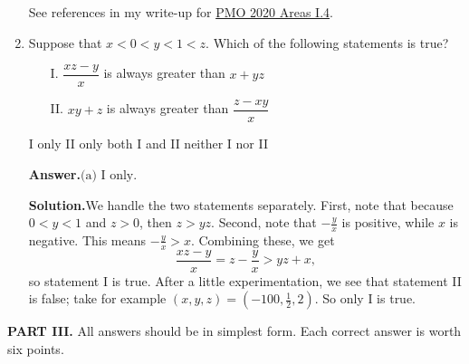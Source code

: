 \documentclass[11pt,paper=letter]{scrartcl}
\newcommand{\ans}{{\sffamily \bfseries Answer.}\;}
\newcommand{\ansb}[2]{\ans\(\boxed{\text{(#1) #2}}\).}
\newcommand{\sol}{{\sffamily \bfseries Solution.}\;}
\newenvironment{rem}%
{\noindent \ignorespaces \small \sffamily \sansmath {\bfseries Remark.}}%
{\ignorespacesafterend}
\begin{document}
\begin{enumerate}[left=0pt]
\begin{rem}
See references in my write-up for \href{https://cjquines.com/files/pmo2020areas.pdf}{PMO 2020 Areas I.4}.
\end{rem}

\item Suppose that $x < 0 < y < 1 < z$. Which of the following statements is true?

\begin{enumerate}
\item[I.] $\dfrac{xz - y}{x}$ is always greater than $x + yz$
\item [II.] $xy + z$ is always greater than $\dfrac{z - xy}{x}$
\end{enumerate}

\fourch
{I only}
{II only}
{both I and II}
{neither I nor II}

\ansb{a}{I only}

\sol We handle the two statements separately. First, note that because $0 < y < 1$ and $z > 0$, then $z > yz$. Second, note that $-\frac{y}{x}$ is positive, while $x$ is negative. This means $-\frac{y}{x} > x$. Combining these, we get \[
  \frac{xz - y}{x}
  = z - \frac{y}{x}
  > yz + x,
\]
so statement I is true. After a little experimentation, we see that statement II is false; take for example $(x, y, z) = \left(-100, \frac{1}{2}, 2\right)$. So only I is true.

\end{enumerate}

\noindent\textbf{PART III.} All answers should be in simplest form. Each correct answer is worth six points.
\end{document}
